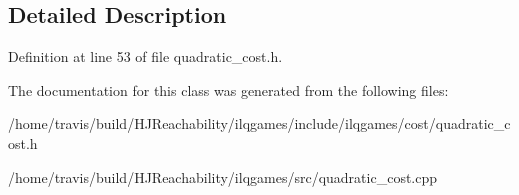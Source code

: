 \subsection{Detailed Description}


Definition at line 53 of file quadratic\+\_\+cost.\+h.



The documentation for this class was generated from the following files\+:\begin{DoxyCompactItemize}
\item 
/home/travis/build/\+H\+J\+Reachability/ilqgames/include/ilqgames/cost/quadratic\+\_\+cost.\+h\item 
/home/travis/build/\+H\+J\+Reachability/ilqgames/src/quadratic\+\_\+cost.\+cpp\end{DoxyCompactItemize}
